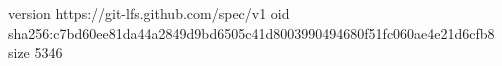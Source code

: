 version https://git-lfs.github.com/spec/v1
oid sha256:c7bd60ee81da44a2849d9bd6505c41d8003990494680f51fc060ae4e21d6cfb8
size 5346
